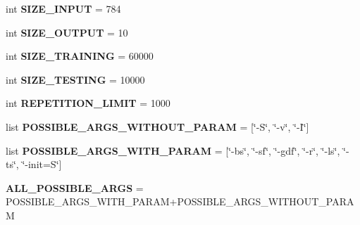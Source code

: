 \begin{DoxyCompactItemize}
\item 
int {\bfseries S\+I\+Z\+E\+\_\+\+I\+N\+P\+UT} = 784\hypertarget{namespacesrc_1_1argumentsManager_a0da63482a81ae3a3b42015f58edcf9f3}{}\label{namespacesrc_1_1argumentsManager_a0da63482a81ae3a3b42015f58edcf9f3}

\item 
int {\bfseries S\+I\+Z\+E\+\_\+\+O\+U\+T\+P\+UT} = 10\hypertarget{namespacesrc_1_1argumentsManager_a5af010b163f2408921411102573d20f8}{}\label{namespacesrc_1_1argumentsManager_a5af010b163f2408921411102573d20f8}

\item 
int {\bfseries S\+I\+Z\+E\+\_\+\+T\+R\+A\+I\+N\+I\+NG} = 60000\hypertarget{namespacesrc_1_1argumentsManager_aecacdbe391b5ed956cc99935025bc273}{}\label{namespacesrc_1_1argumentsManager_aecacdbe391b5ed956cc99935025bc273}

\item 
int {\bfseries S\+I\+Z\+E\+\_\+\+T\+E\+S\+T\+I\+NG} = 10000\hypertarget{namespacesrc_1_1argumentsManager_aa1a99cd76365685c3fd645d657f3246c}{}\label{namespacesrc_1_1argumentsManager_aa1a99cd76365685c3fd645d657f3246c}

\item 
int {\bfseries R\+E\+P\+E\+T\+I\+T\+I\+O\+N\+\_\+\+L\+I\+M\+IT} = 1000\hypertarget{namespacesrc_1_1argumentsManager_a7aaa449fa1099b201b2e0f4ff601e665}{}\label{namespacesrc_1_1argumentsManager_a7aaa449fa1099b201b2e0f4ff601e665}

\item 
list {\bfseries P\+O\+S\+S\+I\+B\+L\+E\+\_\+\+A\+R\+G\+S\+\_\+\+W\+I\+T\+H\+O\+U\+T\+\_\+\+P\+A\+R\+AM} = \mbox{[}\char`\"{}-\/S\char`\"{}, \char`\"{}-\/v\char`\"{}, \char`\"{}-\/I\char`\"{}\mbox{]}\hypertarget{namespacesrc_1_1argumentsManager_ad1a134cf4111f1c17bd3ccdf78035057}{}\label{namespacesrc_1_1argumentsManager_ad1a134cf4111f1c17bd3ccdf78035057}

\item 
list {\bfseries P\+O\+S\+S\+I\+B\+L\+E\+\_\+\+A\+R\+G\+S\+\_\+\+W\+I\+T\+H\+\_\+\+P\+A\+R\+AM} = \mbox{[}\char`\"{}-\/bs\char`\"{}, \char`\"{}-\/sf\char`\"{}, \char`\"{}-\/gdf\char`\"{}, \char`\"{}-\/r\char`\"{}, \char`\"{}-\/ls\char`\"{}, \char`\"{}-\/ts\char`\"{}, \char`\"{}-\/init=S\char`\"{}\mbox{]}\hypertarget{namespacesrc_1_1argumentsManager_a60104cd76409424d219c71247b4f869b}{}\label{namespacesrc_1_1argumentsManager_a60104cd76409424d219c71247b4f869b}

\item 
{\bfseries A\+L\+L\+\_\+\+P\+O\+S\+S\+I\+B\+L\+E\+\_\+\+A\+R\+GS} = P\+O\+S\+S\+I\+B\+L\+E\+\_\+\+A\+R\+G\+S\+\_\+\+W\+I\+T\+H\+\_\+\+P\+A\+R\+AM+P\+O\+S\+S\+I\+B\+L\+E\+\_\+\+A\+R\+G\+S\+\_\+\+W\+I\+T\+H\+O\+U\+T\+\_\+\+P\+A\+R\+AM\hypertarget{namespacesrc_1_1argumentsManager_a65e51c3922e5d4024effe55f284ad482}{}\label{namespacesrc_1_1argumentsManager_a65e51c3922e5d4024effe55f284ad482}


\end{DoxyCompactItemize}
